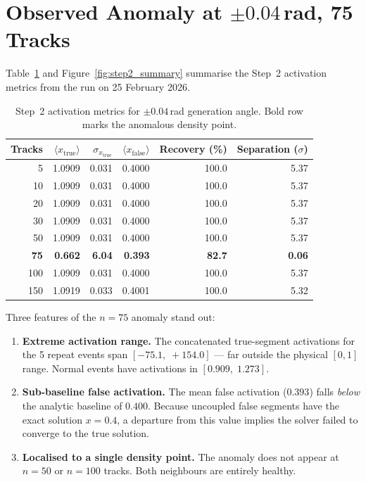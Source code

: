 \documentclass[12pt,a4paper]{article}
\begin{document}
\section{Observed Anomaly at $\pm0.04$\,rad, 75 Tracks}
\label{sec:anomaly}

Table~\ref{tab:step2} and Figure~\ref{fig:step2_summary} summarise the Step~2
activation metrics from the run on 25 February 2026.

\begin{table}[h!]
  \centering
  \caption{Step~2 activation metrics for $\pm0.04$\,rad generation angle.
           Bold row marks the anomalous density point.}
  \label{tab:step2}
  \begin{tabular}{rrrrrr}
    \toprule
    Tracks & $\langle x_\text{true}\rangle$ & $\sigma_{x_\text{true}}$ &
    $\langle x_\text{false}\rangle$ & Recovery (\%) & Separation ($\sigma$) \\
    \midrule
    5   & 1.0909 & 0.031 & 0.4000 & 100.0 & 5.37 \\
    10  & 1.0909 & 0.031 & 0.4000 & 100.0 & 5.37 \\
    20  & 1.0909 & 0.031 & 0.4000 & 100.0 & 5.37 \\
    30  & 1.0909 & 0.031 & 0.4000 & 100.0 & 5.37 \\
    50  & 1.0909 & 0.031 & 0.4000 & 100.0 & 5.37 \\
    \textbf{75}  & \textbf{0.662} & \textbf{6.04} & \textbf{0.393} &
    \textbf{82.7} & \textbf{0.06} \\
    100 & 1.0909 & 0.031 & 0.4000 & 100.0 & 5.37 \\
    150 & 1.0919 & 0.033 & 0.4001 & 100.0 & 5.32 \\
    \bottomrule
  \end{tabular}
\end{table}

\noindent Three features of the $n=75$ anomaly stand out:

\begin{enumerate}
  \item \textbf{Extreme activation range.}
    The concatenated true-segment activations for the 5 repeat events span
    $[-75.1,\;+154.0]$ — far outside the physical $[0,1]$ range.
    Normal events have activations in $[0.909,\;1.273]$.
  \item \textbf{Sub-baseline false activation.}
    The mean false activation ($0.393$) falls \emph{below} the analytic
    baseline of $0.400$.
    Because uncoupled false segments have the exact solution $x = 0.4$,
    a departure from this value implies the solver failed to converge to
    the true solution.
  \item \textbf{Localised to a single density point.}
    The anomaly does not appear at $n=50$ or $n=100$ tracks.
    Both neighbours are entirely healthy.
\end{enumerate}
\end{document}
